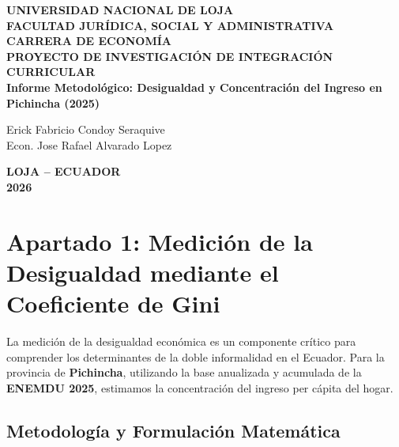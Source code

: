 \documentclass[12pt,spanish]{article}
\begin{document}
\begin{titlepage}
    \begin{center}
        {\bfseries \Large UNIVERSIDAD NACIONAL DE LOJA}\\[0.5cm]
        {\bfseries \large FACULTAD JURÍDICA, SOCIAL Y ADMINISTRATIVA}\\[0.3cm]
        {\bfseries \large CARRERA DE ECONOMÍA}\\[2.5cm]
        
        {\bfseries \large PROYECTO DE INVESTIGACIÓN DE INTEGRACIÓN CURRICULAR}\\[1.5cm]
        
        {\bfseries \Large Informe Metodológico: Desigualdad y
Concentración del Ingreso en Pichincha (2025)}\\[2.5cm]
    \end{center}
    
    \vfill
     Erick Fabricio Condoy Seraquive \\
     Econ. Jose Rafael Alvarado Lopez \\
    
    \vspace{2cm}
    
    \begin{center}
        {\bfseries LOJA -- ECUADOR}\\[0.2cm]
        {\bfseries 2026}
    \end{center}
\end{titlepage}

\newpage
{}
\setcounter{page}{1}

\section{Apartado 1: Medición de la Desigualdad mediante el Coeficiente
de
Gini}\label{apartado-1-mediciuxf3n-de-la-desigualdad-mediante-el-coeficiente-de-gini}

La medición de la desigualdad económica es un componente crítico para
comprender los determinantes de la doble informalidad en el Ecuador.
Para la provincia de \textbf{Pichincha}, utilizando la base anualizada y
acumulada de la \textbf{ENEMDU 2025}, estimamos la concentración del
ingreso per cápita del hogar.

\subsection{Metodología y Formulación
Matemática}\label{metodologuxeda-y-formulaciuxf3n-matemuxe1tica}
\end{document}
